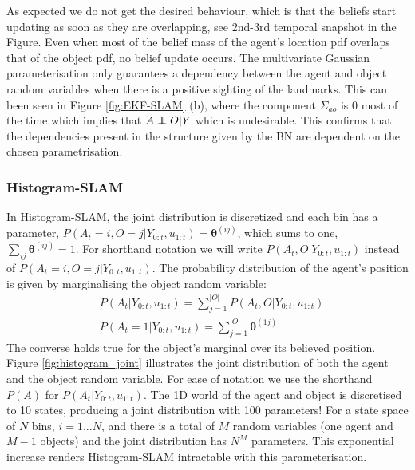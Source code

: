 As expected we do not get the desired behaviour, which is that the beliefs start updating as soon as they are overlapping, 
see 2nd-3rd temporal snapshot in the Figure. 
Even when most of the belief mass of the agent's location pdf overlaps that of the object pdf, no belief update occurs. 
The multivariate Gaussian parameterisation only guarantees a dependency between the agent and object random variables 
when there is a positive sighting of the landmarks.  This can been seen in Figure \ref{fig:EKF-SLAM} (b),
where the component $\Sigma_{ao}$ is 0 most of the time which implies that $A \independent O | Y$ which is undesirable. 
This confirms that the dependencies present in the structure given by the BN are dependent on the chosen parametrisation.

\subsubsection{Histogram-SLAM}\label{sec:Discrete}

In Histogram-SLAM, the joint distribution is discretized and each bin has a parameter, 
$P(A_t=i,O=j|Y_{0:t},u_{1:t}) = \boldsymbol{\theta}^{(ij)}$, which sums to one, $\sum_{ij} \boldsymbol{\theta}^{(ij)} = 1$. 
For shorthand notation we will write $P(A_t,O|Y_{0:t},u_{1:t})$ instead of $P(A_t=i,O=j|Y_{0:t},u_{1:t})$.
The probability distribution of the agent's position is given by marginalising the object random variable:
\begin{align}
 &P(A_t|Y_{0:t},u_{1:t})    = \sum\limits_{j=1}^{|O|} P(A_t,O|Y_{0:t},u_{1:t}) \label{eq:agent_marginal} \\
 &P(A_t=1|Y_{0:t},u_{1:t})  = \sum\limits_{j=1}^{|O|} \boldsymbol{\theta}^{(1j)}
\end{align}
The converse holds true for the object's marginal over its believed position. Figure \ref{fig:histogram_joint} illustrates 
the joint distribution of both the agent and the object random variable. For ease of notation we use the shorthand $P(A)$
for $P(A_t|Y_{0:t},u_{1:t})$. The 1D world of the agent and object is discretised to 10 states, producing 
a joint distribution with 100 parameters!
For a state space of $N$ bins, $i=1...N$, and there is a total of $M$ random variables (one agent and $M-1$ objects)
and the joint distribution has $N^{M}$ parameters. This exponential increase renders Histogram-SLAM intractable
with this parameterisation.

